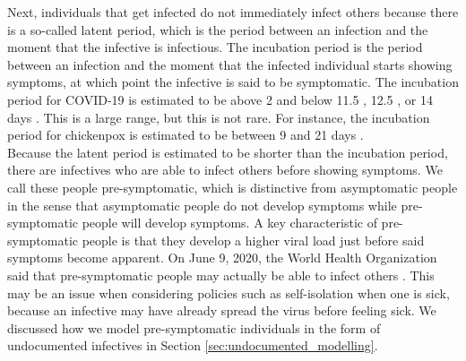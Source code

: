 \documentclass[12pt]{article}
\begin{document}
	Next, individuals that get infected do not immediately infect others because there is a so-called latent period, which is the period between an infection and the moment that the infective is infectious. %
	The incubation period is the period between an infection and the moment that the infected individual starts showing symptoms, at which point the infective is said to be symptomatic. The incubation period for COVID-19 is estimated to be above 2 and below 11.5 \parencite{lauer2020incubation}, 12.5 \parencite{li2020incubation}, or 14 days \parencite{linton2020incubation}. This is a large range, but this is not rare. For instance, the incubation period for chickenpox is estimated to be between 9 and 21 days \parencite{papadopoulos2018chickenpox}. %
	\\
	
	Because the latent period is estimated to be shorter than the incubation period, there are infectives who are able to infect others before showing symptoms. We call these people pre-symptomatic, which is distinctive from asymptomatic people in the sense that asymptomatic people do not develop symptoms while pre-symptomatic people will develop symptoms. A key characteristic of pre-symptomatic people is that they develop a higher viral load just before said symptoms become apparent. On June 9, 2020, the World Health Organization said that pre-symptomatic people may actually be able to infect others \parencite{bloomberg2020AsymptomaticSpread}. This may be an issue when considering policies such as self-isolation when one is sick, because an infective may have already spread the virus before feeling sick. %
	We discussed how we model pre-symptomatic individuals in the form of undocumented infectives in Section \ref{sec:undocumented_modelling}.
	\\
	
\end{document}
